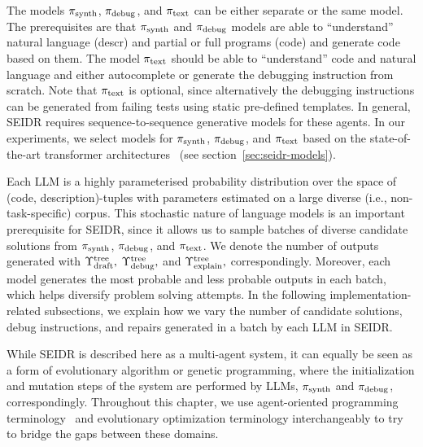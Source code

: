 The models $ \pi_\text{synth} $, $ \pi_\text{debug} $, and $ \pi_\text{text} $ can be either separate or the same model.
The prerequisites are that $ \pi_\text{synth} $ and $ \pi_\text{debug} $ models are able to ``understand'' natural language (descr) and partial or full programs (code) and generate code based on them. 
The model $ \pi_\text{text} $ should be able to ``understand'' code and natural language and either autocomplete or generate the debugging instruction from scratch. 
Note that $ \pi_\text{text} $ is optional, since alternatively the debugging instructions can be generated from failing tests using static pre-defined templates.
In general, SEIDR requires sequence-to-sequence generative models for these agents. 
In our experiments, we select models for $ \pi_\text{synth} $, $ \pi_\text{debug} $, and $ \pi_\text{text} $ based on the state-of-the-art transformer architectures~\cite{vaswaniAttentionAllYou2023} 
(see section~\ref{sec:seidr-models}). 

Each LLM is a highly parameterised probability distribution over the space of (code, description)-tuples with parameters estimated on a large diverse (i.e., non-task-specific) corpus.
This stochastic nature of language models is an important prerequisite for SEIDR, since it allows us to sample batches of diverse candidate solutions from $ \pi_\text{synth} $, $ \pi_\text{debug} $, and $ \pi_\text{text} $. 
We denote the number of outputs generated with $\Upsilon^\text{tree}_\text{draft},$ $\Upsilon^\text{tree}_\text{debug},$ and $\Upsilon^\text{tree}_\text{explain},$ correspondingly.
Moreover, each model generates the most probable and less probable outputs in each batch, which helps diversify problem solving attempts. 
In the following implementation-related subsections, we explain how we vary the number of candidate solutions, debug instructions, and repairs generated in a batch by each LLM in SEIDR.

While SEIDR is described here as a multi-agent system, it can equally be seen as a form of evolutionary algorithm or genetic programming, where the initialization and mutation steps of the system are performed by LLMs, $ \pi_\text{synth} $ and $ \pi_\text{debug} $, correspondingly.
Throughout this chapter, we use agent-oriented programming terminology~\cite{shohamAgentorientedProgramming1993} and evolutionary optimization terminology interchangeably to try to bridge the gaps between these domains.

